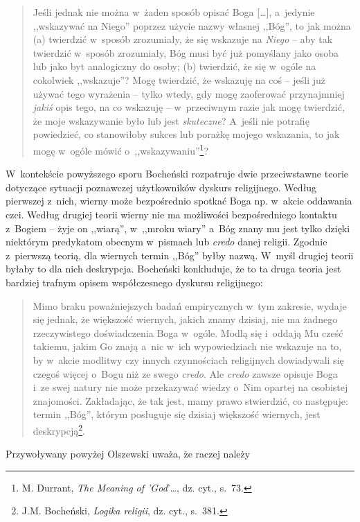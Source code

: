 \begin{quote}
Jeśli jednak nie można w~żaden sposób opisać Boga [\ldots], a~jedynie ,,wskazywać na Niego'' poprzez użycie nazwy własnej ,,Bóg'', to jak można (a) twierdzić w~sposób zrozumiały, że się wskazuje na \textit{Niego} -- aby tak twierdzić w~sposób zrozumiały, Bóg musi być już pomyślany jako osoba lub jako byt analogiczny do osoby; (b) twierdzić, że się w~ogóle na cokolwiek ,,wskazuje''? Mogę twierdzić, że wskazuję na coś -- jeśli już używać tego wyrażenia -- tylko wtedy, gdy mogę zaoferować przynajmniej \textit{jakiś} opis tego, na co wskazuję -- w~przeciwnym razie jak mogę twierdzić, że moje wskazywanie było lub jest \textit{skuteczne}? A~jeśli nie potrafię powiedzieć, co stanowiłoby sukces lub porażkę mojego wskazania, to jak mogę w~ogóle mówić o~,,wskazywaniu''\footnote{M. Durrant, \textit{The Meaning of 'God}'\ldots, dz. cyt., s.~73.}?
\end{quote}

W~kontekście powyższego sporu Bocheński rozpatruje dwie przeciwstawne teorie dotyczące sytuacji poznawczej użytkowników dyskurs religijnego. Według pierwszej z~nich, wierny może bezpośrednio spotkać Boga np. w~akcie oddawania czci. Według drugiej teorii wierny nie ma możliwości bezpośredniego kontaktu z~Bogiem -- żyje on ,,wiarą'', w~,,mroku wiary'' a~Bóg znany mu jest tylko dzięki niektórym predykatom obecnym w~pismach lub \textit{credo} danej religii. Zgodnie z~pierwszą teorią, dla wiernych termin ,,Bóg'' byłby nazwą. W~myśl drugiej teorii byłaby to dla nich deskrypcja. Bocheński konkluduje, że to ta druga teoria jest bardziej trafnym opisem współczesnego dyskursu religijnego:

\begin{quote}
Mimo braku poważniejszych badań empirycznych w~tym zakresie, wydaje się jednak, że większość wiernych, jakich znamy dzisiaj, nie ma żadnego rzeczywistego doświadczenia Boga w~ogóle. Modlą się i~oddają Mu cześć takiemu, jakim Go znają a~nic w~ich wypowiedziach nie wskazuje na to, by w~akcie modlitwy czy innych czynnościach religijnych dowiadywali się czegoś więcej o~Bogu niż ze swego \textit{credo}. Ale \textit{credo} zawsze opisuje Boga i~ze swej natury nie może przekazywać wiedzy o~Nim opartej na osobistej znajomości. Zakładając, że tak jest, mamy prawo stwierdzić, co następuje: termin ,,Bóg'', którym posługuje się dzisiaj większość wiernych, jest deskrypcją\footnote{J.M. Bocheński, \textit{Logika religii}, dz. cyt., s.~381.}.
\end{quote}
Przywoływany powyżej Olszewski uważa, że raczej należy

